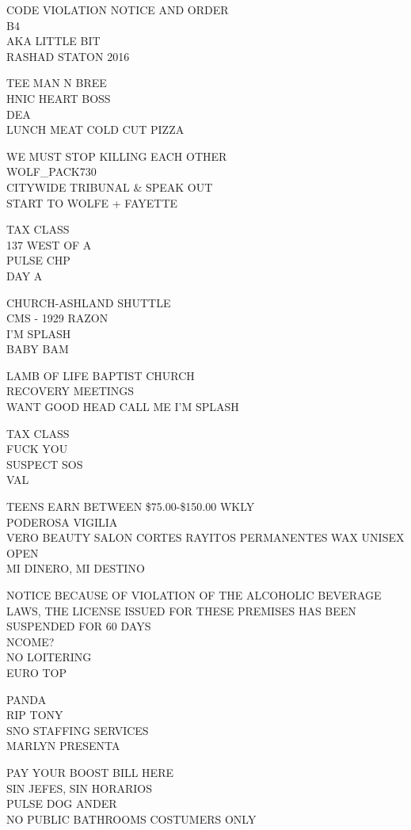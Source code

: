 \documentclass[10pt,letterpaper]{article}
\begin{document}
CODE VIOLATION NOTICE AND ORDER\\
B4\\
AKA LITTLE BIT\\
RASHAD STATON 2016

TEE MAN N BREE\\
HNIC HEART BOSS\\
DEA\\
LUNCH MEAT COLD CUT PIZZA

WE MUST STOP KILLING EACH OTHER\\
WOLF\_PACK730\\
CITYWIDE TRIBUNAL \& SPEAK OUT\\
START TO WOLFE + FAYETTE

TAX CLASS\\
137 WEST OF A\\
PULSE CHP\\
DAY A

CHURCH{-}ASHLAND SHUTTLE\\
CMS {-} 1929 RAZON\\
I'M SPLASH\\
BABY BAM

LAMB OF LIFE BAPTIST CHURCH\\
RECOVERY MEETINGS\\
WANT GOOD HEAD CALL ME I'M SPLASH

TAX CLASS\\
FUCK YOU\\
SUSPECT SOS\\
VAL

TEENS EARN BETWEEN \$75.00{-}\$150.00 WKLY\\
PODEROSA VIGILIA\\
VERO BEAUTY SALON CORTES RAYITOS PERMANENTES WAX UNISEX OPEN\\
MI DINERO, MI DESTINO

NOTICE BECAUSE OF VIOLATION OF THE ALCOHOLIC BEVERAGE LAWS, THE LICENSE ISSUED FOR THESE PREMISES HAS BEEN SUSPENDED FOR 60 DAYS\\
NCOME?\\
NO LOITERING\\
EURO TOP

PANDA\\
RIP TONY\\
SNO STAFFING SERVICES\\
MARLYN PRESENTA

PAY YOUR BOOST BILL HERE\\
SIN JEFES, SIN HORARIOS\\
PULSE DOG ANDER\\
NO PUBLIC BATHROOMS COSTUMERS ONLY
\end{document}
